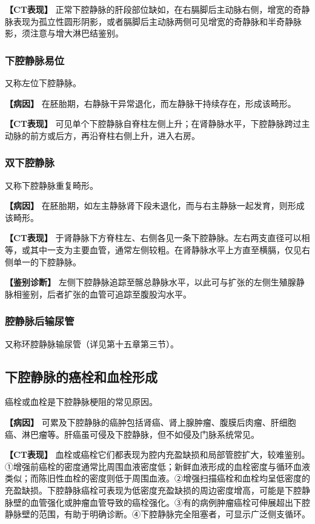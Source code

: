 \textbf{【CT表现】}
正常下腔静脉的肝段部位缺如，在右膈脚后主动脉右侧，增宽的奇静脉表现为孤立性圆形阴影，或者膈脚后主动脉两侧可见增宽的奇静脉和半奇静脉影，须注意与增大淋巴结鉴别。

\subsubsection{下腔静脉易位}

又称左位下腔静脉。

\textbf{【病因】}
在胚胎期，右静脉干异常退化，而左静脉干持续存在，形成该畸形。

\textbf{【CT表现】}
可见单个下腔静脉自脊柱左侧上升；在肾静脉水平，下腔静脉跨过主动脉的前方或后方，再沿脊柱右侧上升，进入右房。

\subsubsection{双下腔静脉}

又称下腔静脉重复畸形。

\textbf{【病因】}
在胚胎期，如左主静脉肾下段未退化，而与右主静脉一起发育，则形成该畸形。

\textbf{【CT表现】}
于肾静脉下方脊柱左、右侧各见一条下腔静脉。左右两支直径可以相等，或其中一支为主要血管，通常左侧较粗。在肾静脉水平上方直至横膈，仅见右侧单一的下腔静脉。

\textbf{【鉴别诊断】}
左侧下腔静脉追踪至髂总静脉水平，以此可与扩张的左侧生殖腺静脉相鉴别，后者扩张的血管可追踪至腹股沟水平。

\subsubsection{腔静脉后输尿管}

又称环腔静脉输尿管（详见第十五章第三节）。

\subsection{下腔静脉的癌栓和血栓形成}

癌栓或血栓是下腔静脉梗阻的常见原因。

\textbf{【病因】}
可累及下腔静脉的癌肿包括肾癌、肾上腺肿瘤、腹膜后肉瘤、肝细胞癌、淋巴瘤等。肝癌虽可侵及下腔静脉，但不如侵及门脉系统常见。

\textbf{【CT表现】}
血栓或癌栓它们都表现为腔内充盈缺损和局部管腔扩大，较难鉴别。①增强前癌栓的密度通常比周围血液密度低；新鲜血液形成的血栓密度与循环血液类似；而陈旧性血栓的密度则低于周围血液。②增强扫描癌栓和血栓均呈低密度的充盈缺损。下腔静脉癌栓可表现为低密度充盈缺损的周边密度增高，可能是下腔静脉壁的血管强化或肿瘤血管导致的癌栓强化。③有的病例肿瘤癌栓可伸展超出下腔静脉壁的范围，有助于明确诊断。④下腔静脉完全阻塞者，可显示广泛侧支循环。

